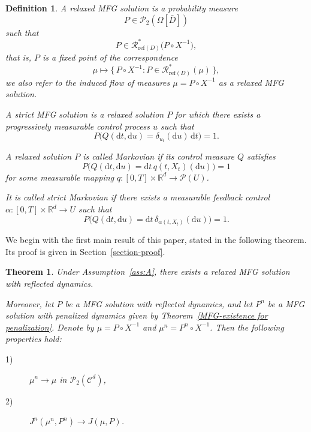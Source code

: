 \documentclass[11pt,amsfonts]{article}
\theoremstyle{plain}
\newtheorem{definition}{Definition}
\newtheorem{theorem}{Theorem}
\theoremstyle{assumpstyle}
\numberwithin{equation}{section}
\numberwithin{theorem}{section}
\numberwithin{proposition}{section}
\numberwithin{definition}{section}
\numberwithin{remark}{section}
\numberwithin{corollary}{section}
\numberwithin{lemma}{section}
\begin{document}
\begin{definition}
A relaxed MFG solution is a probability measure 
\begin{equation*}
P \in \mathcal{P}_2(\Omega[\bar{D}])
\end{equation*}
such that
\begin{equation*}
P \in \mathcal{R}_{\mathrm{ref}(D)}^{*}\bigl(P \circ X^{-1}\bigr),
\end{equation*}
that is, $P$ is a fixed point of the correspondence
\begin{equation*}
\mu \longmapsto 
\bigl\{\, P \circ X^{-1} : P \in \mathcal{R}_{\mathrm{ref}(D)}^{*}(\mu)\, \bigr\},
\end{equation*}
we also refer to the induced flow of measures $\mu = P \circ X^{-1}$ as a relaxed MFG solution.

A \emph{strict MFG solution} is a relaxed solution $P$ for which there exists a progressively measurable control process $u$ such that
\begin{equation*}
P\bigl(Q(\mathrm{d}t,\mathrm{d}u) = \delta_{u_t}(\mathrm{d}u)\,\mathrm{d}t\bigr) = 1.
\end{equation*}

A relaxed solution $P$ is called \emph{Markovian} if its control measure $Q$ satisfies
\begin{equation*}
P\bigl(Q(\mathrm{d}t,\mathrm{d}u)
= \mathrm{d}t\, q(t,X_t)(\mathrm{d}u)\bigr) = 1
\end{equation*}
for some measurable mapping 
$q : [0,T] \times \mathbb{R}^d \to \mathcal{P}(U)$.

It is called \emph{strict Markovian} if there exists a measurable feedback control 
$\alpha : [0,T] \times \mathbb{R}^d \to U$ such that
\begin{equation*}
P\bigl(Q(\mathrm{d}t,\mathrm{d}u)
= \mathrm{d}t\, \delta_{\alpha(t,X_t)}(\mathrm{d}u)\bigr) = 1.
\end{equation*}
\end{definition}

We begin with the first main result of this paper, stated in the following theorem. 
Its proof is given in Section~\ref{section-proof}.
\begin{theorem}\label{MFGR}
Under Assumption~\ref{ass:A}, there exists a relaxed MFG solution with reflected dynamics.

Moreover, let $P$ be a MFG solution with reflected dynamics, and let $P^n$ be a MFG solution with penalized dynamics given by Theorem~\ref{MFG-existence for penalization}. Denote by $\mu = P \circ X^{-1}$ and $\mu^n = P^n \circ X^{-1}$. Then the following properties hold:
\begin{description}
    \item[1)] $\mu^n \to \mu$ in $\mathcal{P}_{2}(\mathcal{C}^d)$,
    \item[2)] $J^n(\mu^n, P^n) \to J(\mu, P)$.
\end{description}
\end{theorem}
\end{document}
